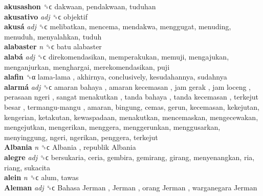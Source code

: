 \textbf{akusashon} ␝ϲ  dakwaan, pendakwaan, tuduhan  \\
\textbf{akusativo} \emph{adj}  ␝ϲ  objektif  \\
\textbf{akusá} \emph{adj}  ␝ϲ  melibatkan, mencema, mendakwa, menggugat, menuding, menuduh, menyalahkan, tuduh  \\
\textbf{alabaster} \emph{n}  ␝ϲ   batu alabaster   \\
\textbf{alabá} \emph{adj}  ␝ϲ  direkomendasikan, memperakukan, memuji, mengajukan, menganjurkan, menghargai, merekomendasikan, puji  \\
\textbf{alafin} ␝α   lama-lama , akhirnya, conclusively, kesudahannya, sudahnya  \\
\textbf{alarmá} \emph{adj}  ␝ϲ   amaran bahaya ,  amaran kecemasan ,  jam gerak ,  jam loceng ,  perasaan ngeri ,  sangat menakutkan ,  tanda bahaya ,  tanda kecemasan ,  terkejut besar ,  termangu-mangu , amaran, bingung, cemas, gerun, kecemasan, kekejutan, kengerian, ketakutan, kewaspadaan, menakutkan, mencemaskan, mengecewakan, mengejutkan, mengerikan, menggera, menggerunkan, menggusarkan, menyinggung, ngeri, ngerikan, penggera, terkejut  \\
\textbf{Albania} \emph{n}  ␝ϲ   Albania ,  republik Albania   \\
\textbf{alegre} \emph{adj}  ␝ϲ  bersukaria, ceria, gembira, gemirang, girang, menyenangkan, ria, riang, sukacita  \\
\textbf{alein} \emph{n}  ␝ϲ  alum, tawas  \\
\textbf{Aleman} \emph{adj}  ␝ϲ   Bahasa Jerman ,  Jerman ,  orang Jerman ,  warganegara Jerman   \\
